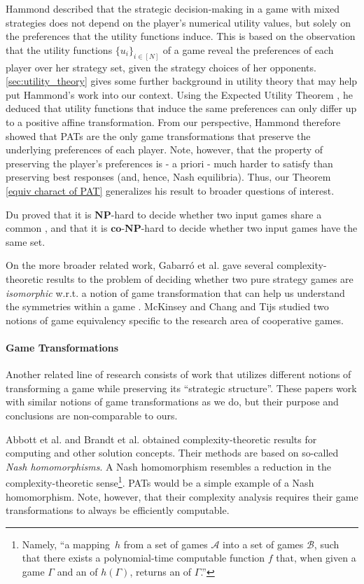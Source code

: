 Hammond \cite{hammond} described that the strategic decision-making in a game with mixed strategies does not depend on the player's numerical utility values, but solely on the preferences that the utility functions induce. This is based on the observation that the utility functions $\{u_i\}_{i \in [N]}$ of a game reveal the preferences of each player over her strategy set, given the strategy choices of her opponents. \ref{sec:utility_theory} gives some further background in utility theory that may help put Hammond's work into our context. Using the Expected Utility Theorem \cite[Prop 6.B.2-3]{MasCol}, he deduced that utility functions that induce the same preferences can only differ up to a positive affine transformation. From our perspective, Hammond therefore showed that PATs are the only game transformations that preserve the underlying preferences of each player. Note, however, that the property of preserving the player's preferences is - a priori - much harder to satisfy than preserving best responses (and, hence, Nash equilibria). Thus, our Theorem \ref{equiv charact of PAT} generalizes his result to broader questions of interest.
    
Du \cite{10.1016/j.tcs.2008.07.021} proved that it is $\mathbf{NP}$-hard to decide whether two input games share a common \NE{}, and that it is $\mathbf{co\text{-}NP}$-hard to decide whether two input games have the same \NE{} set.
    
On the more broader related work, Gabarró et al. \cite{GABARRO20116675, gabarro_garcia_serna_2013} gave several complexity-theoretic results to the problem of deciding whether two pure strategy games are \textit{isomorphic} w.r.t. a notion of game transformation that can help us understand the symmetries within a game \cite[Chapter 3]{harsanyi1988general}. McKinsey \cite{McKinsey} and Chang and Tijs \cite{CoopGamesIsomorphism} studied two notions of game equivalency specific to the research area of cooperative games.

\paragraph{Game Transformations} 
Another related line of research consists of work that utilizes different notions of transforming a game while preserving its ``strategic structure''. These papers work with similar notions of game transformations as we do, but their purpose and conclusions are non-comparable to ours.

Abbott et al. \cite{Abbott05onthe} and Brandt et al. \cite{10.5555/1597538.1597636} obtained complexity-theoretic results for computing \NEs{} and other solution concepts. Their methods are based on so-called \textit{Nash homomorphisms}. A Nash homomorphism resembles a reduction in the complexity-theoretic sense\footnote{Namely, ``a mapping~$h$ from a set of games $\mathcal{A}$ into a set of games $\mathcal{B}$, such that there exists a polynomial-time computable function $f$ that, when given a game $\Gamma$ and an \NE{} of $h(\Gamma)$, returns an \NE{} of $\Gamma$.''}. PATs would be a simple example of a Nash homomorphism. Note, however, that their complexity analysis requires their game transformations to always be efficiently computable.
    
